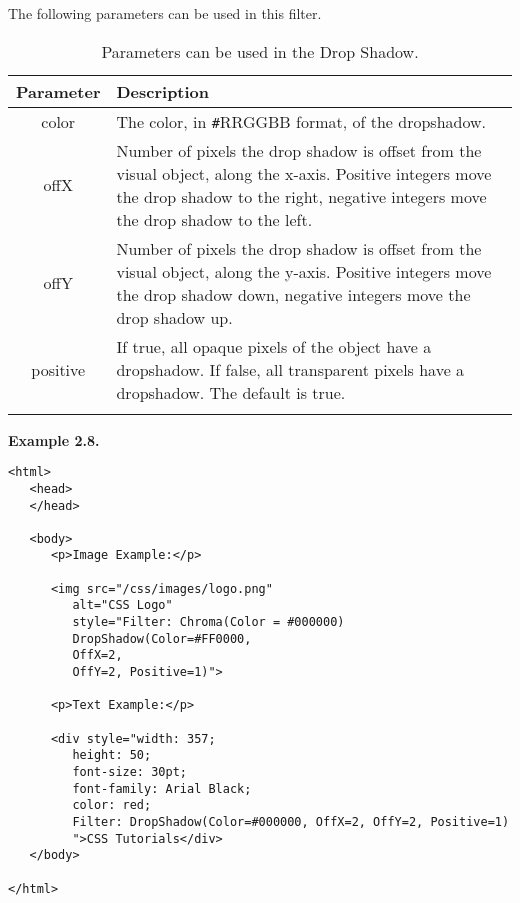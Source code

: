 \documentclass[a4paper,oneside]{book}
\numberwithin{equation}{chapter}
\begin{document}
The following parameters can be used in this filter.
\begin{center}
\begin{longtable}{|c|p{9cm}|}
\hline
\textbf{Parameter} & \textbf{Description}\\
\hline
color & The color, in \verb|#|RRGGBB format, of the dropshadow.\\
\hline
offX & Number of pixels the drop shadow is offset from the visual object, along the x-axis. Positive integers move the drop shadow to the right, negative integers move the drop shadow to the left.\\
\hline
offY & Number of pixels the drop shadow is offset from the visual object, along the y-axis. Positive integers move the drop shadow down, negative integers move the drop shadow up.\\
\hline
positive & If true, all opaque pixels of the object have a dropshadow. If false, all transparent pixels have a dropshadow. The default is true.\\
\hline
\caption{Parameters can be used in the Drop Shadow.}
\end{longtable}
\end{center}
\textbf{Example 2.8.}
\begin{verbatim}
<html>
   <head>
   </head>
   
   <body>
      <p>Image Example:</p>
      
      <img src="/css/images/logo.png" 
         alt="CSS Logo" 
         style="Filter: Chroma(Color = #000000) 
         DropShadow(Color=#FF0000, 
         OffX=2, 
         OffY=2, Positive=1)">
      
      <p>Text Example:</p>
      
      <div style="width: 357; 
         height: 50; 
         font-size: 30pt; 
         font-family: Arial Black; 
         color: red; 
         Filter: DropShadow(Color=#000000, OffX=2, OffY=2, Positive=1)
         ">CSS Tutorials</div>
   </body>
   
</html>
\end{verbatim}
\end{document}
